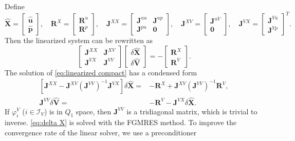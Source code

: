 \documentclass{article}
\begin{document}
Define
\[
  \widehat{\mathbf X} =
  \begin{bmatrix}
    \hat{\mathbf u} \\ \hat{\mathbf p}
  \end{bmatrix},\quad
  \mathbf R^X =
  \begin{bmatrix}
    \mathbf R^u \\ \mathbf R^p
  \end{bmatrix},\quad
  \mathbf J^{XX} =
  \begin{bmatrix}
    \mathbf J^{uu} & \mathbf J^{up} \\ \mathbf J^{pu} & \mathbf 0
  \end{bmatrix},\quad
  \mathbf J^{XV} =
  \begin{bmatrix}
    \mathbf J^{uV} \\ \mathbf 0
  \end{bmatrix},\quad
  \mathbf J^{VX} =
  \begin{bmatrix}
    \mathbf J^{Vu} \\ \mathbf J^{Vp}
  \end{bmatrix}^T.
\]
Then the linearized system can be rewritten as
\begin{equation}\label{eq:linearized compact}
  \begin{bmatrix}
    \mathbf J^{XX} & \mathbf J^{XV} \\ \mathbf J^{VX} & \mathbf J^{VV}
  \end{bmatrix}
  \begin{bmatrix}
    \delta\widehat{\mathbf X} \\ \delta\widehat{\mathbf V}
  \end{bmatrix}
  = -
  \begin{bmatrix}
    \mathbf R^X \\ \mathbf R^V
  \end{bmatrix}.
\end{equation}
The solution of \cref{eq:linearized compact} has a condensed form
\begin{subequations}
  \begin{align}
    \left[\mathbf J^{XX} - \mathbf J^{XV}\left(\mathbf J^{VV}\right)^{-1}\mathbf J^{VX}\right]\delta\widehat{\mathbf X} 
    =&-\mathbf R^X + \mathbf J^{XV}\left(\mathbf J^{VV}\right)^{-1}\mathbf R^V,\\
    \mathbf J^{VV}\delta\widehat{\mathbf V} =&-\mathbf R^V - \mathbf J^{VX}\delta\widehat{\mathbf X}.
  \end{align}
\end{subequations}
If $\varphi^V_i$ ($i\in\mathcal I_V$) is in $Q_1$ space, then $\mathbf J^{VV}$ is a tridiagonal matrix, which is trivial to inverse. \cref{eq:delta X} is solved with the FGMRES method. To improve the convergence rate of the linear solver, we use a preconditioner
\end{document}
